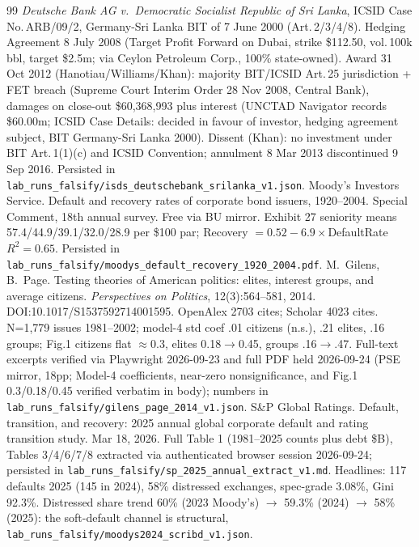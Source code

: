 \documentclass[11pt]{article}
\begin{document}
\begin{thebibliography}{99}
 \textit{Deutsche Bank AG v.\ Democratic Socialist Republic of Sri Lanka}, ICSID Case No.\,ARB/09/2, Germany-Sri Lanka BIT of 7 June 2000 (Art.\,2/3/4/8). Hedging Agreement 8 July 2008 (Target Profit Forward on Dubai, strike \$112.50, vol.\,100k bbl, target \$2.5m; via Ceylon Petroleum Corp., 100\% state-owned). Award 31 Oct 2012 (Hanotiau/Williams/Khan): majority BIT/ICSID Art.\,25 jurisdiction + FET breach (Supreme Court Interim Order 28 Nov 2008, Central Bank), damages on close-out \$60,368,993 plus interest (UNCTAD Navigator records \$60.00m; ICSID Case Details: decided in favour of investor, hedging agreement subject, BIT Germany-Sri Lanka 2000). Dissent (Khan): no investment under BIT Art.\,1(1)(c) and ICSID Convention; annulment 8 Mar 2013 discontinued 9 Sep 2016. Persisted in \texttt{lab\_runs\_falsify/isds\_deutschebank\_srilanka\_v1.json}.
 Moody's Investors Service. Default and recovery rates of corporate bond issuers, 1920--2004. Special Comment, 18th annual survey. Free via BU mirror. Exhibit 27 seniority means 57.4/44.9/39.1/32.0/28.9 per \$100 par; Recovery $=0.52-6.9\times$DefaultRate $R^2=0.65$. Persisted in \texttt{lab\_runs\_falsify/moodys\_default\_recovery\_1920\_2004.pdf}.
 M.\ Gilens, B.\ Page. Testing theories of American politics: elites, interest groups, and average citizens. \textit{Perspectives on Politics}, 12(3):564--581, 2014. DOI:10.1017/S1537592714001595. OpenAlex 2703 cites; Scholar 4023 cites. N=1,779 issues 1981--2002; model-4 std coef .01 citizens (n.s.), .21 elites, .16 groups; Fig.1 citizens flat $\approx$0.3, elites 0.18$\to$0.45, groups .16$\to$.47. Full-text excerpts verified via Playwright 2026-09-23 and full PDF held 2026-09-24 (PSE mirror, 18pp; Model-4 coefficients, near-zero nonsignificance, and Fig.1 0.3/0.18/0.45 verified verbatim in body); numbers in \texttt{lab\_runs\_falsify/gilens\_page\_2014\_v1.json}.
 S\&P Global Ratings. Default, transition, and recovery: 2025 annual global corporate default and rating transition study. Mar 18, 2026. Full Table 1 (1981--2025 counts plus debt \$B), Tables 3/4/6/7/8 extracted via authenticated browser session 2026-09-24; persisted in \texttt{lab\_runs\_falsify/sp\_2025\_annual\_extract\_v1.md}. Headlines: 117 defaults 2025 (145 in 2024), 58\% distressed exchanges, spec-grade 3.08\%, Gini 92.3\%. Distressed share trend 60\% (2023 Moody's) $\to$ 59.3\% (2024) $\to$ 58\% (2025): the soft-default channel is structural, \texttt{lab\_runs\_falsify/moodys2024\_scribd\_v1.json}.

\end{thebibliography}
\end{document}

